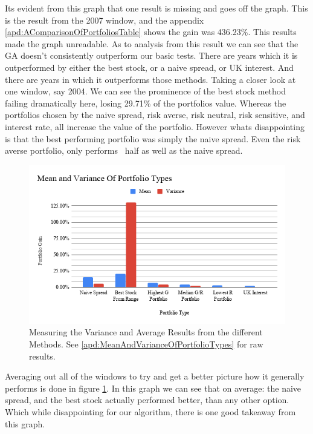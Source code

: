 \documentclass[11pt]{article}
\begin{document}
    Its evident from this graph that one result is missing and goes off the graph. This
    is the result from the 2007 window, and the appendix \ref{apd:AComparisonOfPortfoliosTable}
    shows the gain was 436.23\%. This results made the graph unreadable. As to analysis
    from this result we can see that the GA doesn't consistently outperform our basic
    tests. There are years which it is outperformed by either the best stock, or a naive
    spread, or UK interest. And there are years in which it outperforms those methods.
    Taking a closer
    look at one window, say 2004. We can see the prominence of the best stock method
    failing dramatically here, losing 29.71\% of the portfolios value. Whereas
    the portfolios chosen by the naive spread, risk averse, risk neutral, risk
    sensitive, and interest rate, all increase the value of the portfolio. However
    whats disappointing is that the best performing portfolio was simply the naive spread.
    Even the risk averse portfolio, only performs ~half as well as the naive spread.

    \begin{figure}[H] %
        \includegraphics[width=\textwidth]{MeanAndVarianceOfPortfolioTypes}
        \caption{Measuring the Variance and Average Results from the different Methods. See \ref{apd:MeanAndVarianceOfPortfolioTypes} for raw results.}
            \label{fig:MeanAndVarianceOfPortfolioTypes}
    \end{figure}

    Averaging out all of the windows to try and get a better picture how it generally
    performs is done in figure \ref{fig:MeanAndVarianceOfPortfolioTypes}. In this graph
    we can see that on average: the naive spread, and the best stock actually performed
    better, than any other option. Which while disappointing for our algorithm, there
    is one good takeaway from this graph.
\end{document}
